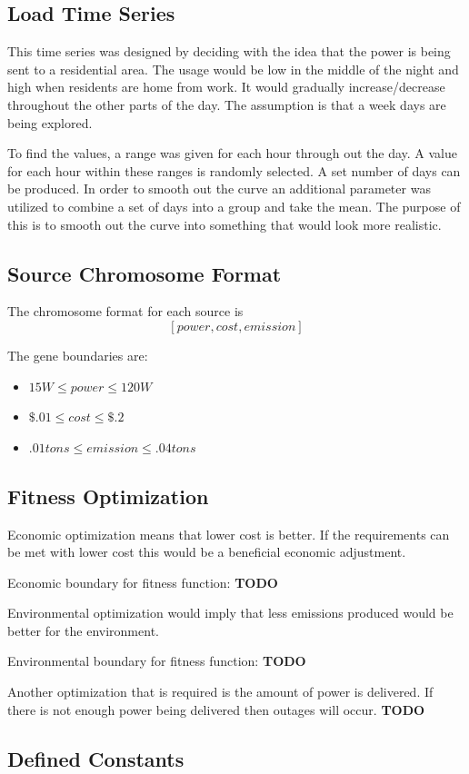 \documentclass[conference]{IEEEtran}
\begin{document}
    \subsection{Load Time Series}
    This time series was designed by deciding with the idea that the power is being sent to a residential area.  The usage would be low in the middle
    of the night and high when residents are home from work.  It would gradually
    increase/decrease throughout the other parts of the day.  The assumption
    is that a week days are being explored.

    To find the values, a range was given for each hour through out the day.
    A value for each hour within these ranges is randomly selected.  A set
    number of days can be produced.  In order to smooth out the curve an additional parameter was utilized to combine a set of days into a group and take the mean.  The purpose of this is to smooth out the curve into something that would look more realistic.

    \subsection{Source Chromosome Format}
    The chromosome format for each source is
    \[[power, cost, emission]\]

    The gene boundaries are:
    \begin{itemize}
        \item \(15W \leq power \leq 120W\)
        \item \(\$.01 \leq cost \leq \$.2\)
        \item \(.01 tons \leq emission \leq .04 tons\)
    \end{itemize}

    \subsection{Fitness Optimization}
    Economic optimization means that lower cost is better.  If the requirements can be met with lower cost this would be a beneficial economic adjustment.

    Economic boundary for fitness function:
    \textbf{TODO}
    \newline 

    Environmental optimization would imply that less emissions produced would be better for the environment.

    Environmental boundary for fitness function:
    \textbf{TODO}
    \newline 

    Another optimization that is required is the amount of power is delivered.  If there is not enough power being delivered then outages will occur.
    \textbf{TODO}

    \subsection{Defined Constants}
        
\end{document}

